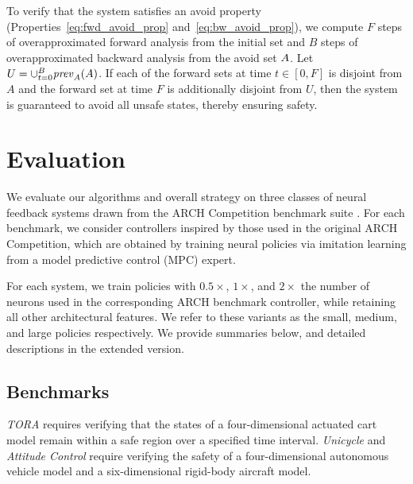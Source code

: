 \documentclass[letterpaper, 10 pt, conference]{ieeeconf}  %
\begin{document}
To verify that the system satisfies an avoid property (Properties~\ref{eq:fwd_avoid_prop} and~\ref{eq:bw_avoid_prop}), we compute $F$ steps of overapproximated forward analysis from the initial set and $B$ steps of overapproximated backward analysis from the avoid set $A$. Let $U = \cup_{t = 0}^B \mathit{prev}_A(A)$.
If each of the forward sets at time $t\in[0,F]$ is disjoint from $A$ and the forward set at time $F$ is additionally disjoint from $U$, then the system is guaranteed to avoid all unsafe states, thereby ensuring safety.
\section{Evaluation}
\label{sec:eval}
We evaluate our algorithms and overall strategy on three classes of neural feedback systems drawn from the ARCH Competition benchmark suite \cite{manzanas_lopez2024arch}. For each benchmark, we consider controllers inspired by those used in the original ARCH Competition, which are obtained by training neural policies via imitation learning from a model predictive control (MPC) expert. 

For each system, we train policies with $0.5\times$, $1\times$, and $2\times$ the number of neurons used in the corresponding ARCH benchmark controller, while retaining all other architectural features. We refer to these variants as the small, medium, and large policies respectively. We provide summaries below, and detailed descriptions in the extended version.
\subsection{Benchmarks}
\emph{TORA} requires verifying that the states of a four-dimensional actuated cart model remain within a safe region over a specified time interval. \emph{Unicycle} and \emph{Attitude Control} require verifying the safety of a four-dimensional autonomous vehicle model and a six-dimensional rigid-body aircraft model.
\end{document}
